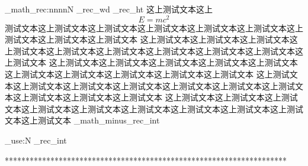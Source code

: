 \documentclass[a4paper,fontset = adobe]{ctexbook}
\begin{document}
      \cexam_math_rec:nnnnN {\test_rec_wd} {\test_rec_ht} {
	这上测试文本这上
	\begin{equation}
	  E=mc^2
	\end{equation}
	测试文本这上测试文本这上测试文本这上测试文本这上测试文本这上测试文本这上测试文本这上测试文本这上测试文本
	这上测试文本这上测试文本这上测试文本这上测试文本这上测试文本这上测试文本这上测试文本这上测试文本这上测试文本这上测试文本
	这上测试文本这上测试文本这上测试文本这上测试文本这上测试文本这上测试文本这上测试文本这上测试文本这上测试文本这上测试文本
	这上测试文本这上测试文本这上测试文本这上测试文本这上测试文本这上测试文本这上测试文本这上测试文本这上测试文本这上测试文本
	这上测试文本这上测试文本这上测试文本这上测试文本这上测试文本这上测试文本这上测试文本这上测试文本这上测试文本这上测试文本
      }{\cexam_math_minus}{\test_rec_int}


      \int_use:N \test_rec_int

      \par
      ********************************************************************
      \par


      \ExplSyntaxOff


      
\end{document}
